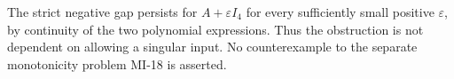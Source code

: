 \begin{remark}
The strict negative gap persists for $A+\varepsilon I_4$ for every sufficiently small positive $\varepsilon$, by continuity of the two polynomial expressions. Thus the obstruction is not dependent on allowing a singular input. No counterexample to the separate monotonicity problem MI-18 is asserted.
\end{remark}
